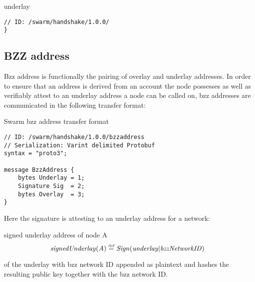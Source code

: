 \begin{definition}{underlay}\label{def:underlay}
\begin{lstlisting}[]
// ID: /swarm/handshake/1.0.0/
}
\end{lstlisting}
\end{definition}




\subsection{BZZ address \statusyellow}

Bzz address is functionally the pairing of overlay and underlay addresses. In order to ensure that an address is derived from an account the node possesses as well as verifiably attest to an underlay address a node can be called on, bzz addresses are communicated in the following transfer format:

\begin{definition}{Swarm bzz address transfer format} \label{def:bzz-address}
\begin{lstlisting}[]
// ID: /swarm/handshake/1.0.0/bzzaddress
// Serialization: Varint delimited Protobuf
syntax = "proto3";

message BzzAddress {
    bytes Underlay = 1;
    Signature Sig  = 2;
    bytes Overlay  = 3; 
}
\end{lstlisting}
\end{definition}

Here the signature is attesting to an underlay address for a network:

\begin{definition}{signed underlay address of node A}\label{def:signed-underlay}
\begin{equation}
\mathit{signedUnderlay}(A) \overset{\textrm{\tiny def}}{=} \mathit{Sign}(\mathit{underlay}|\mathit{bzzNetworkID})         
\end{equation}
\end{definition}

of the underlay with bzz network ID appended as plaintext and hashes the resulting public key together with the bzz network ID. 

